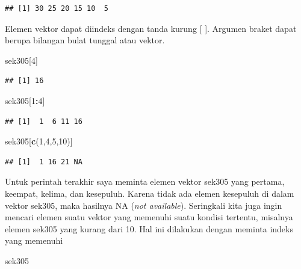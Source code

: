 \documentclass[a4paper, nobind]{templates/ociamthesis}
\newenvironment{Shaded}{\begin{snugshade}}{\end{snugshade}}
\newcommand{\DecValTok}[1]{\textcolor[rgb]{0.00,0.00,0.81}{#1}}
\newcommand{\FunctionTok}[1]{\textcolor[rgb]{0.13,0.29,0.53}{\textbf{#1}}}
\newcommand{\NormalTok}[1]{#1}
\newcommand{\SpecialCharTok}[1]{\textcolor[rgb]{0.81,0.36,0.00}{\textbf{#1}}}
\renewenvironment{Shaded}
{
  \vspace{10pt}%
  \begin{snugshade}%
}{%
  \end{snugshade}%
  \vspace{8pt}%
}
\begin{document}
\begin{verbatim}
## [1] 30 25 20 15 10  5
\end{verbatim}

Elemen vektor dapat diindeks dengan tanda kurung {[} {]}. Argumen braket dapat berupa bilangan bulat tunggal atau vektor.

\begin{Shaded}
\begin{Highlighting}[]
\NormalTok{sek305[}\DecValTok{4}\NormalTok{]}
\end{Highlighting}
\end{Shaded}

\begin{verbatim}
## [1] 16
\end{verbatim}

\begin{Shaded}
\begin{Highlighting}[]
\NormalTok{sek305[}\DecValTok{1}\SpecialCharTok{:}\DecValTok{4}\NormalTok{]}
\end{Highlighting}
\end{Shaded}

\begin{verbatim}
## [1]  1  6 11 16
\end{verbatim}

\begin{Shaded}
\begin{Highlighting}[]
\NormalTok{sek305[}\FunctionTok{c}\NormalTok{(}\DecValTok{1}\NormalTok{,}\DecValTok{4}\NormalTok{,}\DecValTok{5}\NormalTok{,}\DecValTok{10}\NormalTok{)]}
\end{Highlighting}
\end{Shaded}

\begin{verbatim}
## [1]  1 16 21 NA
\end{verbatim}

Untuk perintah terakhir saya meminta elemen vektor sek305 yang pertama, keempat, kelima, dan kesepuluh. Karena tidak ada elemen kesepuluh di dalam vektor sek305, maka hasilnya NA (\emph{not available}). Seringkali kita juga ingin mencari elemen suatu vektor yang memenuhi suatu kondisi tertentu, misalnya elemen sek305 yang kurang dari 10. Hal ini dilakukan dengan meminta indeks yang memenuhi

\begin{Shaded}
\begin{Highlighting}[]
\NormalTok{sek305}
\end{Highlighting}
\end{Shaded}
\end{document}
